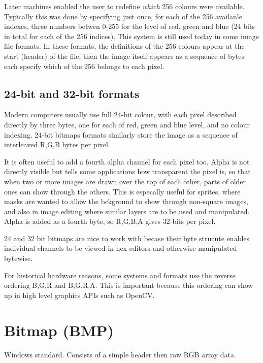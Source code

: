 \documentclass[oneside,english]{scrbook}
\begin{document}
Later machines enabled the user to redefine {\em which} 256 colours were available.   Typically this was done by specifying just once, for each of the 256 availanle indexes, three numbers betwen 0-255 for the level of red, green and blue (24 bits in total for each of the 256 indices).  This system is still used today in some image file formats.  In these formats, the definitions of the 256 colours appear at the start (header) of the file, then the image itself appears as a sequence of bytes each specify which of the 256 belongs to each pixel.

\subsection{24-bit and 32-bit formats}

Modern computers usually use full 24-bit colour, with each pixel described directly by three bytes, one for each of red, green and blue level, and no colour indexing.    24-bit bitmaps formats similarly store the image as a sequence of interleaved R,G,B bytes per pixel.

It is often useful to add a fourth alpha channel for each pixel too. Alpha is not directly visible but tells some applications how transparent the pixel is, so that when two or more images are drawn over the top of each other, parts of older ones can show through the others.   This is especally useful for sprites, where masks are wanted to allow the bckground to show through non-square images, and also in image editing where similar layers are to be used and manipulated.    Alpha is added as a fourth byte, so R,G,B,A gives 32-bits per pixel.

24 and 32 bit bitmaps are nice to work with becase their byte strucute enables individual channels to be viewed in hex editors and otherwise manipulated bytewise.   

For historical hardware reasons, some systems and formats use the reverse ordering B,G,R and B,G,R,A.   This is important because this ordering can show up in high level graphics APIs such as OpenCV.






\section{Bitmap (BMP)}

Windows standard. Consists of a simple header then raw RGB array data.
\end{document}
